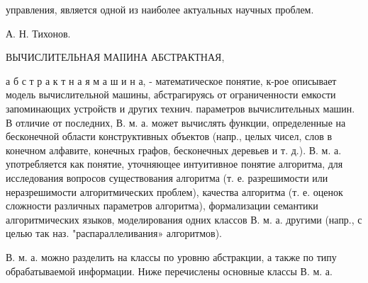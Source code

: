 \documentclass[10pt]{article}
\begin{document}
управления, является одной из наиболее актуальных научных проблем.



А. Н. Тихонов.



ВЫЧИСЛИТЕЛЬНАЯ МАІІИНА АБСТРАКТНАЯ,



а б с т р а к т н а я м а ш и н а, - математическое понятие, к-рое описывает модель вычислительной машины, абстрагируясь от ограниченности емкости запоминающих устройств и других технич. параметров вычислительных машин. В отличие от последних, В. м. а. может вычислять функции, определенные на бесконечной области конструктивных объектов (напр., целых чисел, слов в конечном алфавите, конечных графов, бесконечных деревьев и т. д.). В. м. а. употребляется как понятие, уточняющее интуитивное понятие алгоритма, для исследования вопросов существования алгоритма (т. е. разрешимости или неразрешимости алгоритмических проблем), качества алгоритма (т. е. оценок сложности различных параметров алгоритма), формализации семантики алгоритмических языков, моделирования одних классов В. м. а. другими (напр., с целью так наз. "распараллеливания» алгоритмов).



В. м. а. можно разделить на классы по уровню абстракции, а также по типу обрабатываемой информации. Ниже перечислены основные классы В. м. а.
\end{document}

